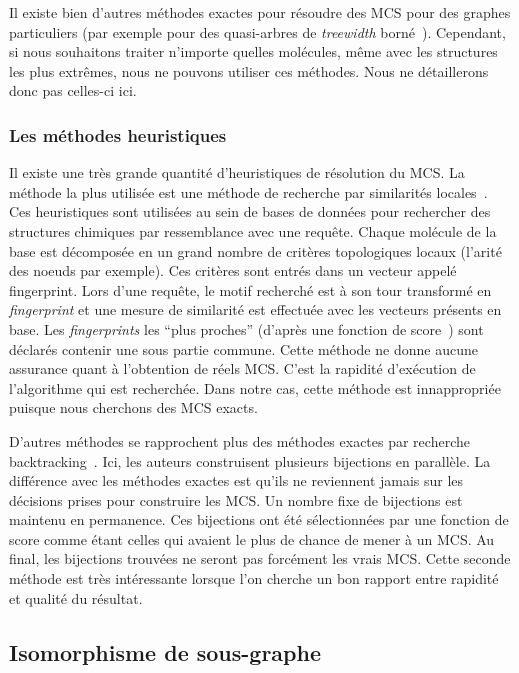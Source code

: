 Il existe bien d'autres méthodes exactes pour résoudre des MCS pour des graphes particuliers (par exemple pour des quasi-arbres de \textit{treewidth} borné~\cite{yamaguchi_finding_2004}).
Cependant, si nous souhaitons traiter n'importe quelles molécules, même avec les structures les plus extrêmes, nous ne pouvons utiliser ces méthodes.
Nous ne détaillerons donc pas celles-ci ici.


\subsubsection{Les méthodes heuristiques}

Il existe une très grande quantité d'heuristiques de résolution du MCS.
La méthode la plus utilisée est une méthode de recherche par similarités locales~\cite{yan_substructure_2005,willett_similarity_2011}.
Ces heuristiques sont utilisées au sein de bases de données pour rechercher des structures chimiques par ressemblance avec une requête.
Chaque molécule de la base est décomposée en un grand nombre de critères topologiques locaux (l'arité des noeuds par exemple).
Ces critères sont entrés dans un vecteur appelé fingerprint.
Lors d'une requête, le motif recherché est à son tour transformé en \textit{fingerprint} et une mesure de similarité est effectuée avec les vecteurs présents en base.
Les \textit{fingerprints} les ``plus proches'' (d'après une fonction de score~\cite{maggiora_molecular_2011,ndiaye_cp_2011}) sont déclarés contenir une sous partie commune.
Cette méthode ne donne aucune assurance quant à l'obtention de réels MCS.
C'est la rapidité d'exécution de l'algorithme qui est recherchée.
Dans notre cas, cette méthode est innappropriée puisque nous cherchons des MCS exacts.

D'autres méthodes se rapprochent plus des méthodes exactes par recherche backtracking~\cite{grosso_simple_2008, wang_fmcsr:_2013}.
Ici, les auteurs construisent plusieurs bijections en parallèle.
La différence avec les méthodes exactes est qu'ils ne reviennent jamais sur les décisions prises pour construire les MCS.
Un nombre fixe de bijections est maintenu en permanence.
Ces bijections ont été sélectionnées par une fonction de score comme étant celles qui avaient le plus de chance de mener à un MCS.
Au final, les bijections trouvées ne seront pas forcément les vrais MCS.
Cette seconde méthode est très intéressante lorsque l'on cherche un bon rapport entre rapidité et qualité du résultat.


\subsection{Isomorphisme de sous-graphe}

